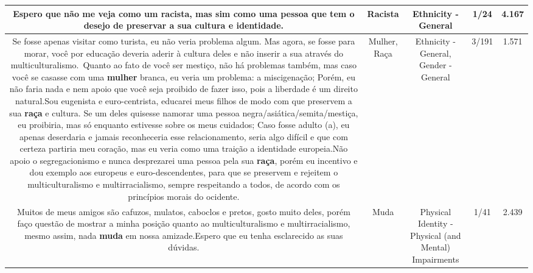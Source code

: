 \documentclass[11pt]{article}
\newlength\mylength
\begin{document}
\begin{center}
\begin{longtable}{|C{.65\mylength}|C{.30\mylength}|C{.12\mylength}|C{.12\mylength}|C{.12\mylength}|}
  \small Espero que não me veja como um \textbf{racista}, mas sim como uma pessoa que tem o desejo de preservar a sua cultura e identidade.\normalsize   & Racista & Ethnicity - General & 1/24 & 4.167 \\  \hline
  \small Se fosse apenas visitar como turista, eu não veria problema algum. Mas agora, se fosse para morar, você por educação deveria aderir à cultura deles e não inserir a sua através do multiculturalismo. Quanto ao fato de você ser mestiço, não há problemas também, mas caso você se casasse com uma \textbf{mulher} branca, eu veria um problema: a miscigenação; Porém, eu não faria nada e nem apoio que você seja proibido de fazer isso, pois a liberdade é um direito natural.Sou eugenista e euro-centrista, educarei meus filhos de modo com que preservem a sua \textbf{raça} e cultura. Se um deles quisesse namorar uma pessoa negra/asiática/semita/mestiça, eu proibiria, mas só enquanto estivesse sobre os meus cuidados; Caso fosse adulto (a), eu apenas deserdaria e jamais reconheceria esse relacionamento, seria algo difícil e que com certeza partiria meu coração, mas eu veria como uma traição a identidade europeia.Não apoio o segregacionismo e nunca desprezarei uma pessoa pela sua \textbf{raça}, porém eu incentivo e dou exemplo aos europeus e euro-descendentes, para que se preservem e rejeitem o multiculturalismo e multirracialismo, sempre respeitando a todos, de acordo com os princípios morais do ocidente.\normalsize   & Mulher, Raça & Ethnicity - General, Gender - General & 3/191 & 1.571 \\  \hline
  \small Muitos de meus amigos são cafuzos, mulatos, caboclos e pretos, gosto muito deles, porém faço questão de mostrar a minha posição quanto ao multiculturalismo e multirracialismo, mesmo assim, nada \textbf{muda} em nossa amizade.Espero que eu tenha esclarecido as suas dúvidas.\normalsize   & Muda & Physical Identity - Physical (and Mental) Impairments & 1/41 & 2.439 \\  \hline

\end{longtable}
\end{center}
\end{document}

